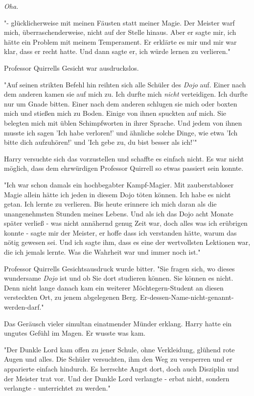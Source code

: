 {\emph{Oha.}

"- glücklicherweise mit meinen Fäusten statt meiner Magie. Der Meister warf mich, überraschenderweise, nicht auf der Stelle hinaus. Aber er sagte mir, ich hätte ein Problem mit meinem Temperament. Er erklärte es mir und mir war klar, dass er recht hatte. Und dann sagte er, ich würde lernen zu verlieren."

Professor Quirrells Gesicht war ausdruckslos.

"Auf seinen strikten Befehl hin reihten sich alle Schüler des \emph{Dojo} auf. Einer nach dem anderen kamen sie auf mich zu. Ich durfte mich \emph{nicht} verteidigen. Ich durfte nur um Gnade bitten. Einer nach dem anderen schlugen sie mich oder boxten mich und stießen mich zu Boden. Einige von ihnen spuckten auf mich. Sie belegten mich mit üblen Schimpfworten in ihrer Sprache. Und jedem von ihnen musste ich sagen 'Ich habe verloren!' und ähnliche solche Dinge, wie etwa 'Ich bitte dich aufzuhören!' und 'Ich gebe zu, du bist besser als ich!'"

Harry versuchte sich das vorzustellen und schaffte es einfach nicht. Es war nicht möglich, dass dem ehrwürdigen Professor Quirrell so etwas passiert sein konnte.

"Ich war schon damals ein hochbegabter Kampf-Magier. Mit zauberstabloser Magie allein hätte ich jeden in diesem Dojo töten können. Ich habe es nicht getan. Ich lernte zu verlieren. Bis heute erinnere ich mich daran als die unangenehmsten Stunden meines Lebens. Und als ich das Dojo acht Monate später verließ - was nicht annähernd genug Zeit war, doch alles was ich erübrigen konnte - sagte mir der Meister, er hoffe dass ich verstanden hätte, warum das nötig gewesen sei. Und ich sagte ihm, dass es eine der wertvollsten Lektionen war, die ich jemals lernte. Was die Wahrheit war und immer noch ist."

Professor Quirrells Gesichtsausdruck wurde bitter. "Sie fragen sich, wo dieses wundersame \emph{Dojo} ist und ob Sie dort studieren können. Sie können es nicht. Denn nicht lange danach kam ein weiterer Möchtegern-Student an diesen versteckten Ort, zu jenem abgelegenen Berg. Er-dessen-Name-nicht-genannt-werden-darf."

Das Geräusch vieler simultan einatmender Münder erklang. Harry hatte ein ungutes Gefühl im Magen. Er wusste was kam.

"Der Dunkle Lord kam offen zu jener Schule, ohne Verkleidung, glühend rote Augen und alles. Die Schüler versuchten, ihm den Weg zu versperren und er apparierte einfach hindurch. Es herrschte Angst dort, doch auch Disziplin und der Meister trat vor. Und der Dunkle Lord verlangte - erbat nicht, sondern verlangte - unterrichtet zu werden."

}
